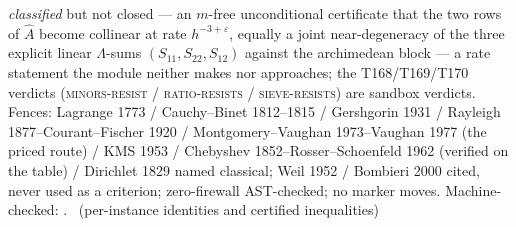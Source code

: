 \documentclass[11pt,a4paper]{article}
\begin{document}
\emph{classified} but not closed --- an $m$-free unconditional
certificate that the two rows of $\hat A$ become collinear at rate
$h^{-3+\varepsilon}$, equally a joint near-degeneracy of the three
explicit linear $\Lambda$-sums $(S_{11},S_{22},S_{12})$ against the
archimedean block --- a rate statement the module neither makes nor
approaches; the T168/T169/T170 verdicts (\textsc{minors-resist} /
\textsc{ratio-resists} / \textsc{sieve-resists}) are sandbox verdicts.
Fences: Lagrange 1773 / Cauchy--Binet 1812--1815 / Gershgorin 1931 /
Rayleigh 1877--Courant--Fischer 1920 / Montgomery--Vaughan
1973--Vaughan 1977 (the priced route) / KMS 1953 / Chebyshev
1852--Rosser--Schoenfeld 1962 (verified on the table) / Dirichlet 1829
named classical; Weil 1952 / Bombieri 2000 cited, never used as a
criterion; zero-firewall AST-checked; no marker moves.
Machine-checked: .
\mE\ (per-instance identities and certified inequalities)
\end{document}
